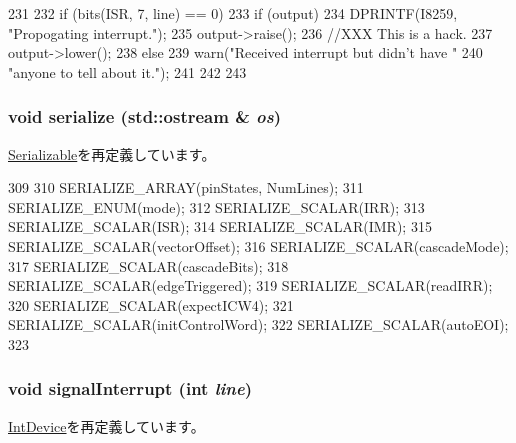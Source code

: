 \begin{DoxyCode}
231 {
232     if (bits(ISR, 7, line) == 0) {
233         if (output) {
234             DPRINTF(I8259, "Propogating interrupt.\n");
235             output->raise();
236             //XXX This is a hack.
237             output->lower();
238         } else {
239             warn("Received interrupt but didn't have "
240                     "anyone to tell about it.\n");
241         }
242     }
243 }
\end{DoxyCode}
\hypertarget{classX86ISA_1_1I8259_a53e036786d17361be4c7320d39c99b84}{
\subsubsection[{serialize}]{\setlength{\rightskip}{0pt plus 5cm}void serialize (std::ostream \& {\em os})}}
\label{classX86ISA_1_1I8259_a53e036786d17361be4c7320d39c99b84}


\hyperlink{classSerializable_ad6272f80ae37e8331e3969b3f072a801}{Serializable}を再定義しています。


\begin{DoxyCode}
309 {
310     SERIALIZE_ARRAY(pinStates, NumLines);
311     SERIALIZE_ENUM(mode);
312     SERIALIZE_SCALAR(IRR);
313     SERIALIZE_SCALAR(ISR);
314     SERIALIZE_SCALAR(IMR);
315     SERIALIZE_SCALAR(vectorOffset);
316     SERIALIZE_SCALAR(cascadeMode);
317     SERIALIZE_SCALAR(cascadeBits);
318     SERIALIZE_SCALAR(edgeTriggered);
319     SERIALIZE_SCALAR(readIRR);
320     SERIALIZE_SCALAR(expectICW4);
321     SERIALIZE_SCALAR(initControlWord);
322     SERIALIZE_SCALAR(autoEOI);
323 }
\end{DoxyCode}
\hypertarget{classX86ISA_1_1I8259_a9d80b13f2832340962ab374bc9a14c4f}{
\subsubsection[{signalInterrupt}]{\setlength{\rightskip}{0pt plus 5cm}void signalInterrupt (int {\em line})}}
\label{classX86ISA_1_1I8259_a9d80b13f2832340962ab374bc9a14c4f}


\hyperlink{classX86ISA_1_1IntDevice_a10c7e7cffe2e50c6c515fa1d8f0a4460}{IntDevice}を再定義しています。


